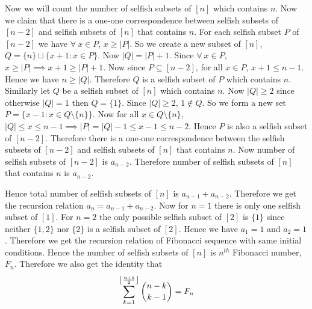 \documentclass[a4paper, 11pt]{article}
\begin{document}
{\begin{enumerate}[label=(\alph*)]
	Now we will count the number of selfish subsets of $[n]$ which  contains $n$. Now we claim that there is a one-one correspondence between selfish subsets of $[n-2]$ and selfish subsets of $[n]$ that contains $n$. For each selfish subset $P$ of $[n-2]$ we have $\forall\ x\in P$, $x\geq |P|$. So we create a new subset of $[n]$, $Q=\{n\}\sqcup\{x+1\colon x\in P\}$. Now $|Q|=|P|+1$. Since $\forall\ x\in P$, $x\geq |P|\implies x+1\geq |P|+1$. Now since $P\subseteq [n-2]$, for all $x\in P$, $x+1\leq n-1$. Hence we have $n\geq |Q|$. Therefore $Q$ is a selfish subset of $P$ which contains $n$.  Similarly let $Q$ be a selfish subset of $[n]$ which contains $n$. Now $|Q|\geq 2$ since otherwise $|Q|=1$ then $Q=\{1\}$. Since $|Q|\geq 2$, $1\notin Q$. So we form a new set $P=\{x-1\colon x\in Q\setminus\{n\}\}$. Now for all $x\in Q\setminus \{n\}$, $|Q|\leq x\leq n-1\implies |P|=|Q|-1\leq x-1\leq n-2$. Hence $P$ is also a selfish subset of $[n-2]$. Therefore there is a one-one correspondence between the selfish subsets of $[n-2]$ and selfish subsets of $[n]$ that contains $n$. Now number of selfish subsets of $[n-2]$ is $a_{n-2}$. Therefore number of selfish subsets of $[n]$ that contains $n$ is $a_{n-2}$. 
	
	Hence total number of selfish subsets of $[n]$ is $a_{n-1}+a_{n-2}$. Therefore we get the recursion relation $a_n=a_{n-1}+a_{n-2}$. Now for $n=1$ there is only one selfish subset of $[1]$. For $n=2$ the only possible selfish subset of $[2] $ is $\{1\}$ since neither $\{1,2\}$ nor $\{2\}$ is a selfish subset of $[2]$. Hence we have $a_1=1$ and $a_2=1$. Therefore we get the recursion relation of Fibonacci sequence with same initial conditions. Hence the number of selfish subsets of $[n]$ is $n^{th}$ Fibonacci number, $F_n$. Therefore we also get the identity that$$ \sum_{k=1}^{\left\lfloor\frac{n+1}2\right\rfloor}\binom{n-k}{k-1}=F_n$$
\end{enumerate}
}

\end{document}
